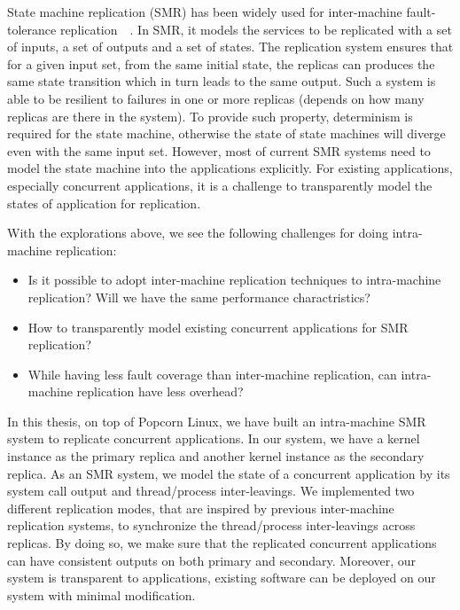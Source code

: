 State machine replication (SMR) has been widely used for inter-machine fault-tolerance replication~\cite{schneider1990implementing}~\cite{lamport1978time}. In SMR, it models the services to be replicated with a set of inputs, a set of outputs and a set of states. The replication system ensures that for a given input set, from the same initial state, the replicas can produces the same state transition which in turn leads to the same output. Such a system is able to be resilient to failures in one or more replicas (depends on how many replicas are there in the system). To provide such property, determinism is required for the state machine, otherwise the state of state machines will diverge even with the same input set. However, most of current SMR systems need to model the state machine into the applications explicitly. For existing applications, especially concurrent applications, it is a challenge to transparently model the states of application for replication.

With the explorations above, we see the following challenges for doing intra-machine replication:
\begin{itemize}
\item Is it possible to adopt inter-machine replication techniques to intra-machine replication? Will we have the same performance charactristics?
\item How to transparently model existing concurrent applications for SMR replication?
\item While having less fault coverage than inter-machine replication, can intra-machine replication have less overhead?
\end{itemize}

In this thesis, on top of Popcorn Linux, we have built an intra-machine SMR system to replicate concurrent applications. In our system, we have a kernel instance as the primary replica and another kernel instance as the secondary replica. As an SMR system, we model the state of a concurrent application by its system call output and thread/process inter-leavings. We implemented two different replication modes, that are inspired by previous inter-machine replication systems, to synchronize the thread/process inter-leavings across replicas. By doing so, we make sure that the replicated concurrent applications can have consistent outputs on both primary and secondary. Moreover, our system is transparent to applications, existing software can be deployed on our system with minimal modification.


